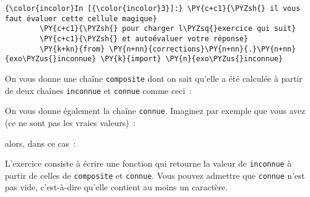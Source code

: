    \begin{Verbatim}[commandchars=\\\{\},frame=single,framerule=0.3mm,rulecolor=\color{cellframecolor}]
{\color{incolor}In [{\color{incolor}3}]:} \PY{c+c1}{\PYZsh{} il vous faut évaluer cette cellule magique}
        \PY{c+c1}{\PYZsh{} pour charger l\PYZsq{}exercice qui suit}
        \PY{c+c1}{\PYZsh{} et autoévaluer votre réponse}
        \PY{k+kn}{from} \PY{n+nn}{corrections}\PY{n+nn}{.}\PY{n+nn}{exo\PYZus{}inconnue} \PY{k}{import} \PY{n}{exo\PYZus{}inconnue}
\end{Verbatim}


    On vous donne une chaîne \texttt{composite} dont on sait qu'elle a été
calculée à partir de deux chaînes \texttt{inconnue} et \texttt{connue}
comme ceci~:

\begin{Shaded}
\begin{Highlighting}[frame=lines,framerule=0.6mm,rulecolor=\color{asisframecolor}]
\OperatorTok{=}\OperatorTok{+}\OperatorTok{+}
\end{Highlighting}
\end{Shaded}

    On vous donne également la chaîne \texttt{connue}. Imaginez par exemple
que vous avez (ce ne sont pas les vraies valeurs)~:

\begin{Shaded}
\begin{Highlighting}[frame=lines,framerule=0.6mm,rulecolor=\color{asisframecolor}]
\OperatorTok{=} 
\OperatorTok{=} 
\end{Highlighting}
\end{Shaded}

alors, dans ce cas~:

\begin{Shaded}
\begin{Highlighting}[frame=lines,framerule=0.6mm,rulecolor=\color{asisframecolor}]
\OperatorTok{=} 
\end{Highlighting}
\end{Shaded}

    L'exercice consiste à écrire une fonction qui retourne la valeur de
\texttt{inconnue} à partir de celles de \texttt{composite} et
\texttt{connue}. Vous pouvez admettre que \texttt{connue} n'est pas
vide, c'est-à-dire qu'elle contient au moins un caractère.

